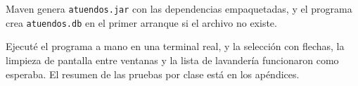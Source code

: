 Maven genera \texttt{atuendos.jar} con las dependencias empaquetadas, y el programa crea \texttt{atuendos.db} en el primer arranque si el archivo no existe.

Ejecuté el programa a mano en una terminal real, y la selección con flechas, la limpieza de pantalla entre ventanas y la lista de lavandería funcionaron como esperaba. El resumen de las pruebas por clase está en los apéndices.
